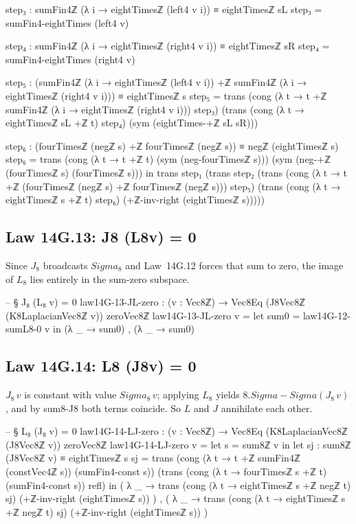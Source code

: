 \documentclass[11pt,a4paper]{book}
\def\Sigma{Sigma}%
\def\cdot{.}%
\def\texttt#1{#1}%
\def\texorpdfstring#1#2{#2}%
\begin{document}
\begin{code}
    step₃ : sumFin4ℤ (λ i → eightTimesℤ (left4 v i)) ≡ eightTimesℤ sL
    step₃ = sumFin4-eightTimes (left4 v)

    step₄ : sumFin4ℤ (λ i → eightTimesℤ (right4 v i)) ≡ eightTimesℤ sR
    step₄ = sumFin4-eightTimes (right4 v)

    step₅ : (sumFin4ℤ (λ i → eightTimesℤ (left4 v i)) +ℤ sumFin4ℤ (λ i → eightTimesℤ (right4 v i))) ≡
            eightTimesℤ s
    step₅ =
      trans
        (cong (λ t → t +ℤ sumFin4ℤ (λ i → eightTimesℤ (right4 v i))) step₃)
        (trans
          (cong (λ t → eightTimesℤ sL +ℤ t) step₄)
          (sym (eightTimes-+ℤ sL sR)))

    step₆ : (fourTimesℤ (negℤ s) +ℤ fourTimesℤ (negℤ s)) ≡ negℤ (eightTimesℤ s)
    step₆ =
      trans
        (cong (λ t → t +ℤ t) (sym (neg-fourTimesℤ s)))
        (sym (neg-+ℤ (fourTimesℤ s) (fourTimesℤ s)))
  in
  trans
    step₁
    (trans
      step₂
      (trans
        (cong (λ t → t +ℤ (fourTimesℤ (negℤ s) +ℤ fourTimesℤ (negℤ s))) step₅)
        (trans
          (cong (λ t → eightTimesℤ s +ℤ t) step₆)
          (+ℤ-inv-right (eightTimesℤ s)))))
\end{code}

\subsection{Law 14G.13: \texorpdfstring{$J_8 (L_8\,v) = 0$}{J8 (L8v) = 0}}

Since $J_8$ broadcasts $\Sigma_8$ and Law~14G.12 forces that sum to zero, the image of $L_8$ lies entirely in the sum-zero subspace.

\begin{code}
-- § J₈ (L₈ v) = 0
law14G-13-JL-zero : (v : Vec8ℤ) → Vec8Eq (J8Vec8ℤ (K8LaplacianVec8ℤ v)) zeroVec8ℤ
law14G-13-JL-zero v =
  let sum0 = law14G-12-sumL8-0 v in
  (λ _ → sum0) , (λ _ → sum0)
\end{code}

\subsection{Law 14G.14: \texorpdfstring{$L_8 (J_8\,v) = 0$}{L8 (J8v) = 0}}

$J_8\,v$ is constant with value $\Sigma_8\,v$; applying $L_8$ yields $8 \cdot \Sigma - \Sigma(J_8\,v)$, and by \texttt{sum8-J8} both terms coincide. So $L$ and $J$ annihilate each other.

\begin{code}
-- § L₈ (J₈ v) = 0
law14G-14-LJ-zero : (v : Vec8ℤ) → Vec8Eq (K8LaplacianVec8ℤ (J8Vec8ℤ v)) zeroVec8ℤ
law14G-14-LJ-zero v =
  let s = sum8ℤ v in
  let sj : sum8ℤ (J8Vec8ℤ v) ≡ eightTimesℤ s
      sj =
        trans
          (cong (λ t → t +ℤ sumFin4ℤ (constVec4ℤ s)) (sumFin4-const s))
          (trans
            (cong (λ t → fourTimesℤ s +ℤ t) (sumFin4-const s))
            refl)
  in
  ( λ _ →
      trans
        (cong (λ t → eightTimesℤ s +ℤ negℤ t) sj)
        (+ℤ-inv-right (eightTimesℤ s))
  ) ,
  ( λ _ →
      trans
        (cong (λ t → eightTimesℤ s +ℤ negℤ t) sj)
        (+ℤ-inv-right (eightTimesℤ s))
  )
\end{code}
\end{document}
